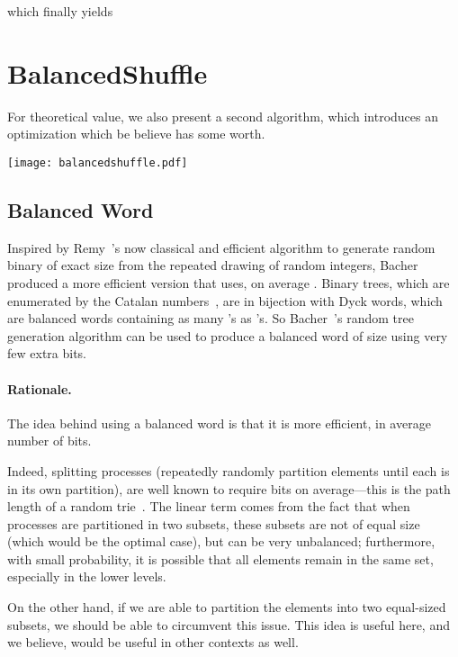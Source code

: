 \documentclass[letter,11pt,en]{quick-document}
\begin{document}
which finally yields






\section{BalancedShuffle}

For theoretical value, we also present a second algorithm, which
introduces an optimization which be believe has some worth.

\begin{bigcenter}
\texttt{[image: balancedshuffle.pdf]}
\end{bigcenter}

\subsection{Balanced Word}


Inspired by Remy~\cite{Remy85}'s now classical and efficient algorithm to
generate random binary of exact size from the repeated drawing of random
integers, Bacher~\etal~\cite{BaBoJa14} produced a more efficient version
that uses, on average . Binary trees,
which are enumerated by the Catalan numbers~\cite{Stanley15}, are in
bijection with Dyck words, which are balanced words containing as many
's as 's. So Bacher~\etal's random tree generation algorithm can be
used to produce a balanced word of size  using very few extra bits.

\paragraph{Rationale.}

The idea behind using a balanced word is that it is more efficient, in
average number of bits.

Indeed, splitting processes (repeatedly randomly partition  elements
until each is in its own partition), are well known to require
 bits on average---this is the path length of a random
trie~\cite{FlSe09}. The linear term comes from the fact that when
processes are partitioned in two subsets, these subsets are not of equal
size (which would be the optimal case), but can be very unbalanced;
furthermore, with small probability, it is possible that all elements
remain in the same set, especially in the lower levels.

On the other hand, if we are able to partition the elements into two
equal-sized subsets, we should be able to circumvent this issue. This idea
is useful here, and we believe, would be useful in other contexts as well.
\end{document}
